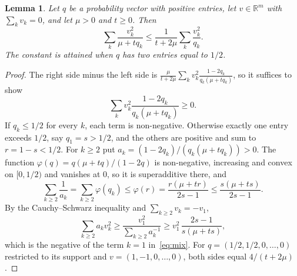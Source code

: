 \documentclass[11pt]{amsart}
\newtheorem{lemma}[theorem]{Lemma}
\theoremstyle{definition}
\theoremstyle{remark}
\newcommand{\R}{\mathbb{R}}
\begin{document}
\begin{lemma}\label{lem:mix}
Let $q$ be a probability vector with positive entries, let $v\in\R^m$ with $\sum_kv_k=0$, and let $\mu>0$ and
$t\ge0$. Then
\[
\sum_k\frac{v_k^2}{\mu+tq_k}\le\frac{1}{t+2\mu}\sum_k\frac{v_k^2}{q_k}.
\]
The constant is attained when $q$ has two entries equal to $1/2$.
\end{lemma}

\begin{proof}
The right side minus the left side is $\frac{\mu}{t+2\mu}\sum_kv_k^2\frac{1-2q_k}{q_k(\mu+tq_k)}$, so it suffices to
show
\begin{equation}\label{eq:mix}
\sum_kv_k^2\frac{1-2q_k}{q_k(\mu+tq_k)}\ge0 .
\end{equation}
If $q_k\le1/2$ for every $k$, each term is non-negative. Otherwise exactly one entry exceeds $1/2$, say $q_1=s>1/2$, and
the others are positive and sum to $r=1-s<1/2$. For $k\ge2$ put $a_k=(1-2q_k)/(q_k(\mu+tq_k))>0$. The function
$\varphi(q)=q(\mu+tq)/(1-2q)$ is non-negative, increasing and convex on $[0,1/2)$ and vanishes at $0$, so it is
superadditive there, and
\[
\sum_{k\ge2}\frac1{a_k}=\sum_{k\ge2}\varphi(q_k)\le\varphi(r)=\frac{r(\mu+tr)}{2s-1}\le\frac{s(\mu+ts)}{2s-1}.
\]
By the Cauchy--Schwarz inequality and $\sum_{k\ge2}v_k=-v_1$,
\[
\sum_{k\ge2}a_kv_k^2\ge\frac{v_1^2}{\sum_{k\ge2}a_k^{-1}}\ge v_1^2\,\frac{2s-1}{s(\mu+ts)},
\]
which is the negative of the term $k=1$ in~\eqref{eq:mix}. For $q=(1/2,1/2,0,\dots,0)$ restricted to its support and
$v=(1,-1,0,\dots,0)$, both sides equal $4/(t+2\mu)$.
\end{proof}
\end{document}

